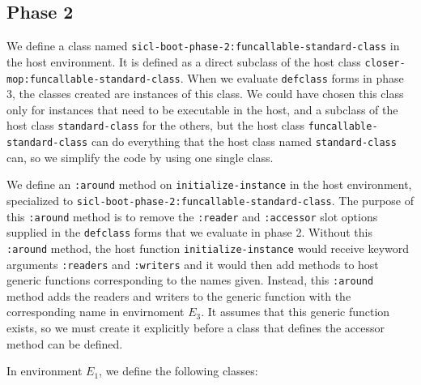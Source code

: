 \subsection{Phase 2}

We define a class named
\texttt{sicl-boot-phase-2:funcallable-standard-class} in the host
environment.  It is defined as a direct subclass of the host class
\texttt{closer-mop:funcallable-standard-class}.  When we
evaluate \texttt{defclass} forms in phase 3, the classes created are
instances of this class.  We could have chosen this class only for
instances that need to be executable in the host, and a subclass of
the host class \texttt{standard-class} for the others, but the host
class \texttt{funcallable-standard-class} can do everything that the
host class named \texttt{standard-class} can, so we simplify the code by
using one single class.

We define an \texttt{:around} method on \texttt{initialize-instance}
in the host environment, specialized to
\texttt{sicl-boot-phase-2:funcallable-standard-class}.  The purpose of
this \texttt{:around} method is to remove the \texttt{:reader} and
\texttt{:accessor} slot options supplied in the \texttt{defclass}
forms that we evaluate in phase 2.  Without this \texttt{:around}
method, the host function \texttt{initialize-instance} would receive
keyword arguments \texttt{:readers} and \texttt{:writers} and it would
then add methods to host generic functions corresponding to the names
given.  Instead, this \texttt{:around} method adds the readers and
writers to the generic function with the corresponding name in
envirnoment $E_3$.  It assumes that this generic function exists, so
we must create it explicitly before a class that defines the accessor
method can be defined.

In environment $E_1$, we define the following classes:


